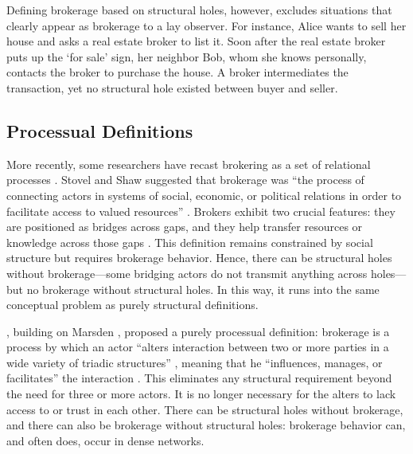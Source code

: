 \documentclass[
]{article}
\begin{document}
Defining brokerage based on structural holes, however, excludes situations that clearly appear as brokerage to a lay observer. For instance, Alice wants to sell her house and asks a real estate broker to list it. Soon after the real estate broker puts up the `for sale' sign, her neighbor Bob, whom she knows personally, contacts the broker to purchase the house. A broker intermediates the transaction, yet no structural hole existed between buyer and seller.

\subsection{Processual Definitions}

More recently, some researchers have recast brokering as a set of relational processes \autocite{obstfeldBrokerageProcessDecoupling2014,rossmanObfuscatoryRelationalWork2014,spiroExtendedStructuresMediation2013,stovelBrokerage2012}. Stovel and Shaw suggested that brokerage was ``the process of connecting actors in systems of social, economic, or political relations in order to facilitate access to valued resources'' \autocites[141]{stovelBrokerage2012}[see also][]{stovelStabilizingBrokerage2011}. Brokers exhibit two crucial features: they are positioned as bridges across gaps, and they help transfer resources or knowledge across those gaps \autocite[141]{stovelBrokerage2012}. This definition remains constrained by social structure but requires brokerage behavior. Hence, there can be structural holes without brokerage---some bridging actors do not transmit anything across holes---but no brokerage without structural holes. In this way, it runs into the same conceptual problem as purely structural definitions.

\textcite{obstfeldBrokerageProcessDecoupling2014}, building on Marsden \autocite*{marsdenBrokerageBehaviorRestricted1982}, proposed a purely processual definition: brokerage is a process by which an actor ``alters interaction between two or more parties in a wide variety of triadic structures'' \autocite[136]{obstfeldBrokerageProcessDecoupling2014}, meaning that he ``influences, manages, or facilitates'' the interaction \autocite[141]{obstfeldBrokerageProcessDecoupling2014}. This eliminates any structural requirement beyond the need for three or more actors. It is no longer necessary for the alters to lack access to or trust in each other. There can be structural holes without brokerage, and there can also be brokerage without structural holes: brokerage behavior can, and often does, occur in dense networks.
\end{document}
